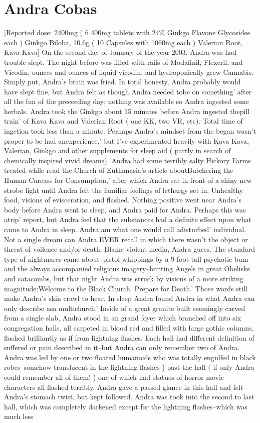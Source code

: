 \documentclass[12pt]{book}
\begin{document}
\chapter{Andra Cobas}

[Reported dose: 2400mg ( 6 400mg tablets with 24\% Ginkgo Flavone Glycosides each ) Ginkgo Biloba, 10.6g ( 10 Capsules with 1060mg each ) Valerian Root, Kava Kava] On the second day of January of the year 2003, Andra was had trouble slept. The night before was filled with rails of Modafinil, Flexeril, and Vicodin, ounces and ounces of liquid vicodin, and hydroponically grew Cannabis. Simply put, Andra's brain was fried. In total honesty, Andra probably would have slept fine, but Andra felt as though Andra needed tobe on something' after all the fun of the preceeding day; nothing was available so Andra ingested some herbals. Andra took the Ginkgo about 15 minutes before Andra ingested thepill train' of Kava Kava and Valerian Root ( one KK, two VR, etc). Total time of ingetion took less than a minute. Perhaps Andra's mindset from the began wasn't proper to be had anexperience,' but I've experimented heavily with Kava Kava, Valerian, Ginkgo and other supplements for sleep aid ( partly in search of chemically inspired vivid dreams). Andra had some terribly salty Hickory Farms treated while read the Church of Euthanasia's article aboutButchering the Human Carcass for Consumption,' after which Andra sat in front of a shiny new strobe light until Andra felt the familiar feelings of lethargy set in. Unhealthy food, visions of evisceration, and flashed. Nothing positive went near Andra's body before Andra went to sleep, and Andra paid for Andra. Perhaps this was atrip' report, but Andra feel that the substances had a definite effect upon what came to Andra in sleep. Andra am what one would call adisturbed' individual. Not a single dream can Andra EVER recall in which there wasn't the object or threat of voilence and/or death. Blame violent media, Andra guess. The standard type of nightmares came about--pistol whippings by a 9 foot tall psychotic bum--and the always accompanied religious imagery--hunting Angels in great Obelisks and catacombs, but that night Andra was struck by visions of a more striking magnitude:Welcome to the Black Church. Prepare for Death.' Those words still make Andra's skin crawl to hear. In sleep Andra found Andra in what Andra can only describe asa multichurch.' Inside of a great granite built seemingly carved from a single slab, Andra stood in an grand foyer which branched off into six congregation halls, all carpeted in blood red and filled with large gothic columns, flashed brilliantly as if from lightning flashes. Each hall had different definition of suffered or pain described in it--but Andra can only remember two of Andra. Andra was led by one or two floated humanoids who was totally engulfed in black robes--somehow translucent in the lightning flashes ) past the hall ( if only Andra could remember all of them! ) one of which had statues of horror movie characters all flashed terribly. Andra gave a passed glance in this hall and felt Andra's stomach twist, but kept followed. Andra was took into the second to last hall, which was completely darkened except for the lightning flashes--which was much less 
\end{document}
